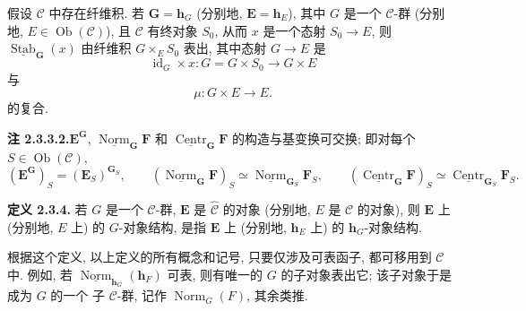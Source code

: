 假设 \(\mathscr C\) 中存在纤维积. 若
\(\mathbf G=\mathbf h_G\) (分别地,
\(\mathbf E=\mathbf h_E\)), 其中 \(G\) 是一个 \(\mathscr C\)-群
(分别地, \(E\in\operatorname{Ob}(\mathscr C)\)), 且
\(\mathscr C\) 有终对象 \(S_0\), 从而 \(x\) 是一个态射
\(S_0\to E\), 则
\(\underline{\operatorname{Stab}}_{\mathbf G}(x)\) 由纤维积
\(G\times_E S_0\) 表出, 其中态射 \(G\to E\) 是
\[
  \operatorname{id}_G\times x:
  G=G\times S_0\longrightarrow G\times E
\]
与
\[
  \mu:G\times E\longrightarrow E.
\]
的复合.

\medskip
\noindent{}\textbf{注 2.3.3.2.}\footnotemark[\value{footnote}]
\(\mathbf E^{\mathbf G}\),
\(\underline{\operatorname{Norm}}_{\mathbf G}\mathbf F\) 和
\(\underline{\operatorname{Centr}}_{\mathbf G}\mathbf F\) 的构造与基变换可交换;
即对每个
\(S\in\operatorname{Ob}(\mathscr C)\),
\[
  (\mathbf E^{\mathbf G})_S=(\mathbf E_S)^{\mathbf G_S},
  \qquad
  (\underline{\operatorname{Norm}}_{\mathbf G}\mathbf F)_S
    \simeq
  \underline{\operatorname{Norm}}_{\mathbf G_S}\mathbf F_S,
  \qquad
  (\underline{\operatorname{Centr}}_{\mathbf G}\mathbf F)_S
    \simeq
  \underline{\operatorname{Centr}}_{\mathbf G_S}\mathbf F_S.
\]

\medskip
\noindent{}\textbf{定义 2.3.4.}
若 \(G\) 是一个 \(\mathscr C\)-群, \(\mathbf E\) 是
\(\widehat{\mathscr C}\) 的对象 (分别地, \(E\) 是
\(\mathscr C\) 的对象), 则 \(\mathbf E\) 上 (分别地, \(E\) 上)
的 \(G\)-对象结构, 是指 \(\mathbf E\) 上 (分别地, \(\mathbf h_E\) 上)
的 \(\mathbf h_G\)-对象结构.

根据这个定义, 以上定义的所有概念和记号, 只要仅涉及可表函子,
都可移用到 \(\mathscr C\) 中. 例如, 若
\(\underline{\operatorname{Norm}}_{\mathbf h_G}(\mathbf h_F)\) 可表,
则有唯一的 \(G\) 的子对象表出它; 该子对象于是成为 \(G\) 的一个
子 \(\mathscr C\)-群, 记作 \(\operatorname{Norm}_G(F)\), 其余类推.

